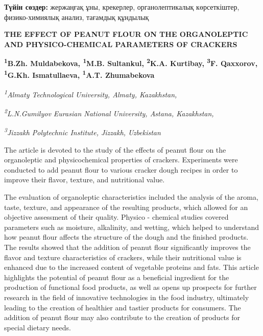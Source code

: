 {\bfseries Түйін сөздер:} жержаңғақ ұны, крекерлер, органолептикалық
көрсеткіштер, физико-химиялық анализ, тағамдық құндылық

\begin{articleheader}
{\bfseries THE EFFECT OF PEANUT FLOUR ON THE ORGANOLEPTIC AND PHYSICO-CHEMICAL PARAMETERS OF CRACKERS}

{\bfseries  
\textsuperscript{1}B.Zh. Muldabekova,  
\textsuperscript{1}M.B. Sultankul\textsuperscript{\envelope },  
\textsuperscript{2}K.A. Kurtibay,  
\textsuperscript{3}F. Qaxxorov,  
\textsuperscript{1}G.Kh. Ismatullaeva,  
\textsuperscript{1}A.T. Zhumabekova}
\end{articleheader}

\begin{affiliation}
\emph{\textsuperscript{1}Almaty Technological University, Almaty, Kazakhstan,}

\emph{\textsuperscript{2}L.N.Gumilyov Eurasian National University, Astana, Kazakhstan,}

\emph{\textsuperscript{3}Jizzakh Polytechnic Institute, Jizzakh, Uzbekistan}
\end{affiliation}

The article is devoted to the study of the effects of peanut flour on
the organoleptic and physicochemical properties of crackers. Experiments
were conducted to add peanut flour to various cracker dough recipes in
order to improve their flavor, texture, and nutritional value.

The evaluation of organoleptic characteristics included the analysis of
the aroma, taste, texture, and appearance of the resulting products,
which allowed for an objective assessment of their quality.
Physico - chemical studies covered parameters such as moisture, alkalinity,
and wetting, which helped to understand how peanut flour affects the
structure of the dough and the finished products. The results showed
that the addition of peanut flour significantly improves the flavor and
texture characteristics of crackers, while their nutritional value is
enhanced due to the increased content of vegetable proteins and fats.
This article highlights the potential of peanut flour as a beneficial
ingredient for the production of functional food products, as well as
opens up prospects for further research in the field of innovative
technologies in the food industry, ultimately leading to the creation of
healthier and tastier products for consumers. The addition of peanut
flour may also contribute to the creation of products for special
dietary needs.

